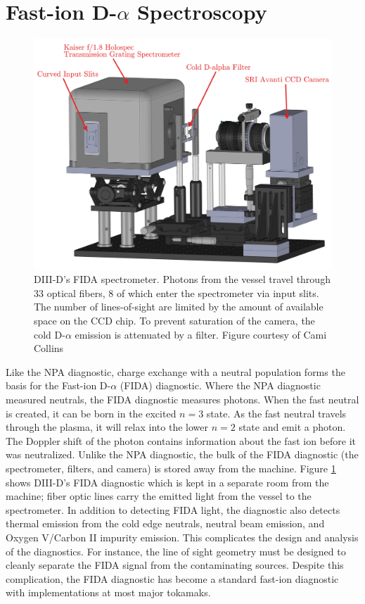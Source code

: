 \section{Fast-ion D-$\alpha$ Spectroscopy}
\begin{figure}[ht]
    \centering
    \includegraphics[width=12cm]{figures/d3d_fida.jpg}
    \caption{DIII-D's FIDA spectrometer\cite{muscatello2010}. Photons from the vessel travel through 33 optical fibers, 8 of which enter the spectrometer via input slits. The number of lines-of-sight are limited by the amount of available space on the CCD chip. To prevent saturation of the camera, the cold D-$\alpha$ emission is attenuated by a filter. Figure courtesy of Cami Collins}
    \label{fig:fida}
\end{figure}
Like the NPA diagnostic, charge exchange with a neutral population forms the basis for the Fast-ion D-$\alpha$ (FIDA) diagnostic\cite{heidbrink2004fida}. Where the NPA diagnostic measured neutrals, the FIDA diagnostic measures photons. When the fast neutral is created, it can be born in the excited $n=3$ state. As the fast neutral travels through the plasma, it will relax into the lower $n=2$ state and emit a photon. The Doppler shift of the photon contains information about the fast ion before it was neutralized. Unlike the NPA diagnostic, the bulk of the FIDA diagnostic (the spectrometer, filters, and camera) is stored away from the machine. Figure \ref{fig:fida} shows DIII-D's FIDA diagnostic which is kept in a separate room from the machine; fiber optic lines carry the emitted light from the vessel to the spectrometer. In addition to detecting FIDA light, the diagnostic also detects thermal emission from the cold edge neutrals, neutral beam emission, and Oxygen V/Carbon II impurity emission. This complicates the design and analysis of the diagnostics. For instance, the line of sight geometry must be designed to cleanly separate the FIDA signal from the contaminating sources. Despite this complication, the FIDA diagnostic has become a standard fast-ion diagnostic with implementations at most major tokamaks\cite{heidbrink2010fast}.

